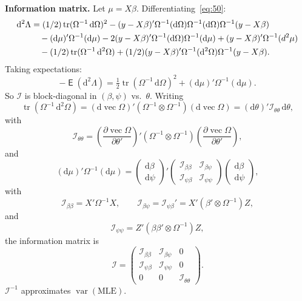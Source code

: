 \documentclass[14pt]{extarticle}
\theoremstyle{plain}
\theoremstyle{definition}
\theoremstyle{remark}
\DeclareMathOperator\expc{\mathsf{E}}
\DeclareMathOperator\var{var}
\DeclareMathOperator{\tr}{tr}
\DeclareMathOperator{\avec}{vec}
\newcommand{\dd}{\mathrm{d}}
\begin{document}
\textbf{Information matrix.} Let $\mu = X\beta$. Differentiating~\eqref{eq:50}:
\begin{align}\label{eq:52}
\dd^2\Lambda &= (1/2)\tr(\Omega^{-1}\, \dd\Omega)^2 - (y - X\beta)'\Omega^{-1}(\dd\Omega)\Omega^{-1}(\dd\Omega)\Omega^{-1}(y - X\beta) \notag \\
&\quad - (\dd\mu)'\Omega^{-1}(\dd\mu) - 2(y - X\beta)'\Omega^{-1}(\dd\Omega)\Omega^{-1}(\dd\mu) + (y - X\beta)'\Omega^{-1}(d^2\mu) \notag \\
&\quad - (1/2)\tr(\Omega^{-1}\, \dd^2\Omega) + (1/2)(y - X\beta)'\Omega^{-1}(\dd^2\Omega)\Omega^{-1}(y - X\beta).
\end{align}
Taking expectations:
\[
-\expc(\dd^2\Lambda) = \tfrac{1}{2}\tr(\Omega^{-1}\, \dd\Omega)^2 + (\dd\mu)'\Omega^{-1}(\dd\mu).
\]
So $\mathcal{I}$ is block-diagonal in $(\beta, \psi)$ vs.\ $\theta$. Writing
\[
\tr(\Omega^{-1}\, \dd^2\Omega) = (\dd\avec\Omega)'(\Omega^{-1} \otimes \Omega^{-1})(\dd\avec\Omega) = (\dd\theta)'\mathcal{I}_{\theta\theta}\, \dd\theta,
\]
with
\[
\mathcal{I}_{\theta\theta} = \left(\frac{\partial \avec\Omega}{\partial \theta'}\right)' (\Omega^{-1} \otimes \Omega^{-1}) \left(\frac{\partial \avec\Omega}{\partial \theta'}\right),
\]
and
\[
(\dd\mu)'\Omega^{-1}(\dd\mu) = \begin{pmatrix} \dd\beta \\ \dd\psi \end{pmatrix}' \begin{pmatrix} \mathcal{I}_{\beta\beta} & \mathcal{I}_{\beta\psi} \\ \mathcal{I}_{\psi\beta} & \mathcal{I}_{\psi\psi} \end{pmatrix} \begin{pmatrix} \dd\beta \\ \dd\psi \end{pmatrix},
\]
with
\[
\mathcal{I}_{\beta\beta} = X'\Omega^{-1}X, \qquad
\mathcal{I}_{\beta\psi} = \mathcal{I}_{\psi\beta}' = X'(\beta' \otimes \Omega^{-1})Z,
\]
and
\[
\mathcal{I}_{\psi\psi} = Z'(\beta\beta' \otimes \Omega^{-1})Z,
\]
the information matrix is
\[
\mathcal{I} = \begin{pmatrix}
\mathcal{I}_{\beta\beta} & \mathcal{I}_{\beta\psi} & 0 \\
\mathcal{I}_{\psi\beta} & \mathcal{I}_{\psi\psi} & 0 \\
0 & 0 & \mathcal{I}_{\theta\theta}
\end{pmatrix}.
\]
$\mathcal{I}^{-1}$ approximates $\var(\text{MLE})$.

\end{document}

